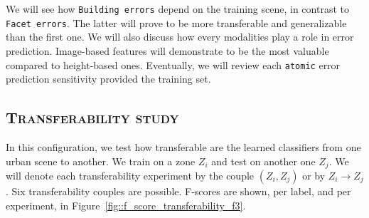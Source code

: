     We will see how \texttt{Building errors} depend on the training scene, in contrast to \texttt{Facet errors}.
    The latter will prove to be more transferable and generalizable than the first one.
    We will also discuss how every modalities play a role in error prediction.
    Image-based features will demonstrate to be the most valuable compared to height-based ones.
    Eventually, we will review each \texttt{atomic} error prediction sensitivity provided the training set.

    \subsection{\textsc{Transferability study}}
        \label{subsec::more_experiments::scalability::transferability}
        In this configuration, we test how transferable are the learned classifiers from one urban scene to another.
        We train on a zone $Z_i$ and test on another one $Z_j$.
        We will denote each transferability experiment by the couple $(Z_i, Z_j)$ or by $Z_i \rightarrow Z_j$.
        Six transferability couples are possible.
        F-scores are shown, per label, and per experiment, in Figure~\ref{fig::f_score_transferability_f3}.\\
        
        \begin{figure}[htbp]
        \end{figure}

